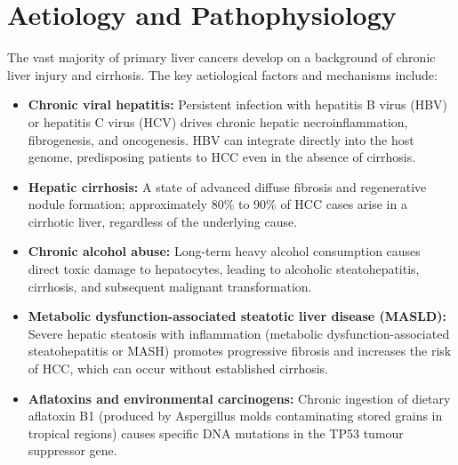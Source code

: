 \section*{Aetiology and Pathophysiology}
The vast majority of primary liver cancers develop on a background of chronic liver injury and cirrhosis. The key aetiological factors and mechanisms include:
\begin{itemize}
    \item \textbf{Chronic viral hepatitis:} Persistent infection with hepatitis B virus (HBV) or hepatitis C virus (HCV) drives chronic hepatic necroinflammation, fibrogenesis, and oncogenesis. HBV can integrate directly into the host genome, predisposing patients to HCC even in the absence of cirrhosis.
    \item \textbf{Hepatic cirrhosis:} A state of advanced diffuse fibrosis and regenerative nodule formation; approximately 80\% to 90\% of HCC cases arise in a cirrhotic liver, regardless of the underlying cause.
    \item \textbf{Chronic alcohol abuse:} Long-term heavy alcohol consumption causes direct toxic damage to hepatocytes, leading to alcoholic steatohepatitis, cirrhosis, and subsequent malignant transformation.
    \item \textbf{Metabolic dysfunction-associated steatotic liver disease (MASLD):} Severe hepatic steatosis with inflammation (metabolic dysfunction-associated steatohepatitis or MASH) promotes progressive fibrosis and increases the risk of HCC, which can occur without established cirrhosis.
    \item \textbf{Aflatoxins and environmental carcinogens:} Chronic ingestion of dietary aflatoxin B1 (produced by Aspergillus molds contaminating stored grains in tropical regions) causes specific DNA mutations in the TP53 tumour suppressor gene.
\end{itemize}

